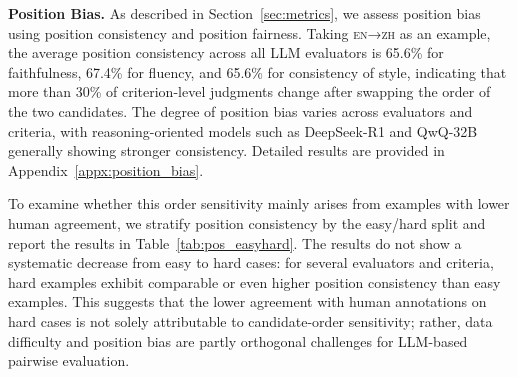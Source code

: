 \documentclass{article}
\theoremstyle{plain}
\theoremstyle{definition}
\theoremstyle{remark}
\newcommand{\enzh}{\textsc{en→zh} }
\begin{document}

\textbf{Position Bias. }As described in Section~\ref{sec:metrics}, we assess position bias using position consistency and position fairness. Taking \enzh as an example, the average position consistency across all LLM evaluators is 65.6\% for faithfulness, 67.4\% for fluency, and 65.6\% for consistency of style, indicating that more than 30\% of criterion-level judgments change after swapping the order of the two candidates. The degree of position bias varies across evaluators and criteria, with reasoning-oriented models such as DeepSeek-R1 and QwQ-32B generally showing stronger consistency. Detailed results are provided in Appendix~\ref{appx:position_bias}.

To examine whether this order sensitivity mainly arises from examples with lower human agreement, we stratify position consistency by the easy/hard split and report the results in Table~\ref{tab:pos_easyhard}. The results do not show a systematic decrease from easy to hard cases: for several evaluators and criteria, hard examples exhibit comparable or even higher position consistency than easy examples. This suggests that the lower agreement with human annotations on hard cases is not solely attributable to candidate-order sensitivity; rather, data difficulty and position bias are partly orthogonal challenges for LLM-based pairwise evaluation.
\end{document}
